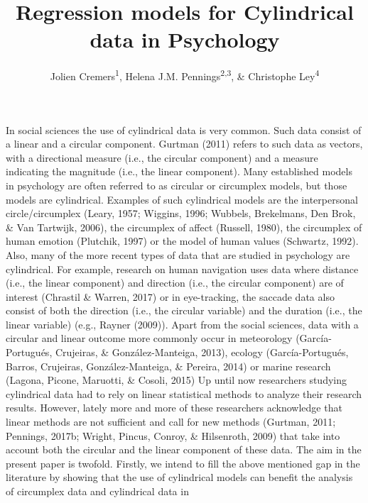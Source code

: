 \documentclass[man,mask]{apa6}
\title{Regression models for Cylindrical data in Psychology}
\author{Jolien Cremers\textsuperscript{1}, Helena J.M. Pennings\textsuperscript{2,3}, \& Christophe Ley\textsuperscript{4}}
\date{}
\affiliation{
\vspace{0.5cm}
\textsuperscript{1} Department of Methodology and Statistics, Utrecht University\\\textsuperscript{2} TNO\\\textsuperscript{3} Department of Education, Utrecht University\\\textsuperscript{4} Department of Applied Mathematics, Computer Science and Statistics, Ghent University}
\DeclareRobustCommand{\VAN}[3]{#2}
\DeclareRobustCommand{\DEN}[3]{#2}
\begin{document}
\maketitle

\vspace{-0.75cm}

In social sciences the use of cylindrical data is very common. Such data consist
of a linear and a circular component. Gurtman (2011) refers to such data
as vectors, with a directional measure (i.e., the circular component) and a
measure indicating the magnitude (i.e., the linear component). Many established
models in psychology are often referred to as circular or circumplex models, but
those models are cylindrical. Examples of such cylindrical models are the
interpersonal circle/circumplex
(Leary, 1957; Wiggins, 1996; Wubbels, Brekelmans, \DEN{Brok}{Den}{den} Brok, \& \VAN{Tartwijk}{Van}{van} Tartwijk, 2006), the circumplex of
affect (Russell, 1980), the circumplex of human emotion
(Plutchik, 1997) or the model of human values (Schwartz, 1992).
\newline
\indent Also, many of the more recent types of data that are studied in psychology are
cylindrical. For example, research on human navigation uses data where distance
(i.e., the linear component) and direction (i.e., the circular component) are of
interest (Chrastil \& Warren, 2017) or in eye-tracking, the saccade data also
consist of both the direction (i.e., the circular variable) and the duration
(i.e., the linear variable) (e.g., Rayner (2009)). Apart from the social
sciences, data with a circular and linear outcome more commonly occur in
meteorology (García-Portugués, Crujeiras, \& González-Manteiga, 2013), ecology (García-Portugués, Barros, Crujeiras, González-Manteiga, \& Pereira, 2014) or
marine research (Lagona, Picone, Maruotti, \& Cosoli, 2015)
\newline
\indent Up until now researchers studying cylindrical data had to rely on linear
statistical methods to analyze their research results. However, lately more and more
of these researchers acknowledge that linear methods are not sufficient and call
for new methods (Gurtman, 2011; Pennings, 2017b; Wright, Pincus, Conroy, \& Hilsenroth, 2009) that take into account both the circular and the linear
component of these data.
\newline
\indent The aim in the present paper is twofold. Firstly, we intend to fill
the above mentioned gap in the literature by showing that the use of cylindrical
models can benefit the analysis of circumplex data and cylindrical data in
\end{document}
